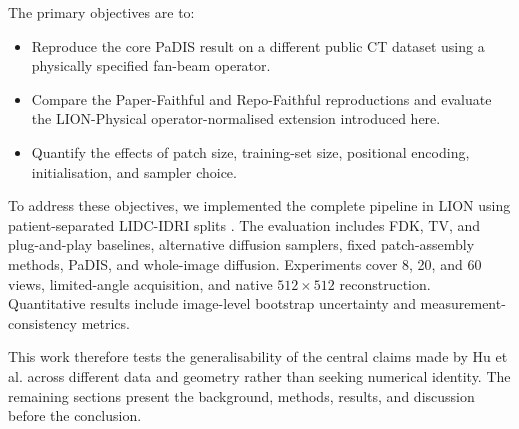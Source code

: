 The primary objectives are to:
\begin{itemize}[leftmargin=1.5em,itemsep=0.1em,topsep=0.2em,parsep=0pt]
    \item Reproduce the core PaDIS result on a different public CT dataset using a physically specified fan-beam operator.
    \item Compare the Paper-Faithful and Repo-Faithful reproductions and evaluate the LION-Physical operator-normalised extension introduced here.
    \item Quantify the effects of patch size, training-set size, positional encoding, initialisation, and sampler choice.
\end{itemize}
To address these objectives, we implemented the complete pipeline in LION \cite{kiss_benchmarking_2025,noauthor_cambridgecialion_2026} using patient-separated LIDC-IDRI splits \cite{armato_iii_data_2015-1,armato_lung_2011}. The evaluation includes FDK, TV, and plug-and-play baselines, alternative diffusion samplers, fixed patch-assembly methods, PaDIS, and whole-image diffusion. Experiments cover 8, 20, and 60 views, limited-angle acquisition, and native $512\times512$ reconstruction. Quantitative results include image-level bootstrap uncertainty and measurement-consistency metrics.

This work therefore tests the generalisability of the central claims made by Hu et al. \cite{hu_learning_2024} across different data and geometry rather than seeking numerical identity. The remaining sections present the background, methods, results, and discussion before the conclusion.
